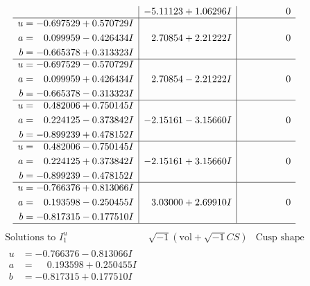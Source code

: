 \documentclass[1p]{elsarticle_modified}
\theoremstyle{definition}
\newcommand{\I}{\sqrt{-1}}
\begin{document}
$$\begin{array}{c|c|c}
 & -5.11123 + 1.06296 I & \phantom{-0.000000 } 0 \\ \hline\begin{aligned}
u &= -0.697529 + 0.570729 I \\
a &= \phantom{-}0.099959 - 0.426434 I \\
b &= -0.665378 + 0.313323 I\end{aligned}
 & \phantom{-}2.70854 + 2.21222 I & \phantom{-0.000000 } 0 \\ \hline\begin{aligned}
u &= -0.697529 - 0.570729 I \\
a &= \phantom{-}0.099959 + 0.426434 I \\
b &= -0.665378 - 0.313323 I\end{aligned}
 & \phantom{-}2.70854 - 2.21222 I & \phantom{-0.000000 } 0 \\ \hline\begin{aligned}
u &= \phantom{-}0.482006 + 0.750145 I \\
a &= \phantom{-}0.224125 - 0.373842 I \\
b &= -0.899239 + 0.478152 I\end{aligned}
 & -2.15161 - 3.15660 I & \phantom{-0.000000 } 0 \\ \hline\begin{aligned}
u &= \phantom{-}0.482006 - 0.750145 I \\
a &= \phantom{-}0.224125 + 0.373842 I \\
b &= -0.899239 - 0.478152 I\end{aligned}
 & -2.15161 + 3.15660 I & \phantom{-0.000000 } 0 \\ \hline\begin{aligned}
u &= -0.766376 + 0.813066 I \\
a &= \phantom{-}0.193598 - 0.250455 I \\
b &= -0.817315 - 0.177510 I\end{aligned}
 & \phantom{-}3.03000 + 2.69910 I & \phantom{-0.000000 } 0\\
 \hline 
 \end{array}$$\newpage$$\begin{array}{c|c|c}  
\text{Solutions to }I^u_{1}& \I (\text{vol} + \sqrt{-1}CS) & \text{Cusp shape}\\
 \hline 
\begin{aligned}
u &= -0.766376 - 0.813066 I \\
a &= \phantom{-}0.193598 + 0.250455 I \\
b &= -0.817315 + 0.177510 I\end{aligned}

\end{array}$$
\end{document}
